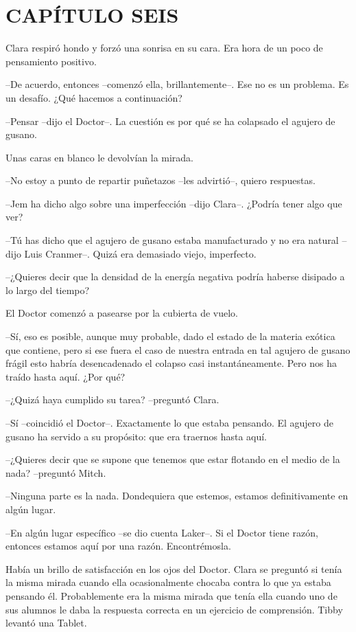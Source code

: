 \chapter*{CAPÍTULO SEIS}

{Clara respiró hondo y forzó una sonrisa en su cara. Era hora de un poco
de pensamiento positivo.}

{--De acuerdo, entonces --comenzó ella, brillantemente--. Ese no es un
problema. Es un desafío. ¿Qué hacemos a continuación?}

{--Pensar --dijo el Doctor--. La cuestión es por qué se ha colapsado el
agujero de gusano.}

{Unas caras en blanco le devolvían la mirada.}

{--No estoy a punto de repartir puñetazos --les advirtió--, quiero
respuestas.}

{--Jem ha dicho algo sobre una imperfección --dijo Clara--. ¿Podría tener
algo que ver?}

{--Tú has dicho que el agujero de gusano estaba manufacturado y no era
natural --dijo Luis Cranmer--. Quizá era demasiado viejo, imperfecto.}

{--¿Quieres decir que la densidad de la energía negativa podría haberse
disipado a lo largo del tiempo?}

{El Doctor comenzó a pasearse por la cubierta de vuelo.}

{--Sí, eso es posible, aunque muy probable, dado el estado de la materia
 exótica que contiene, pero si ese fuera el caso de nuestra entrada en
 tal agujero de gusano frágil esto habría desencadenado el colapso casi
instantáneamente. Pero nos ha traído hasta aquí. ¿Por qué?}

{--¿Quizá haya cumplido su tarea? --preguntó Clara.}

{--Sí --coincidió el Doctor--. Exactamente lo que estaba pensando. El
 agujero de gusano ha servido a su propósito: que era traernos hasta
aquí.}

{--¿Quieres decir que se supone que tenemos que estar flotando en el
medio de la nada? --preguntó Mitch.}

{--Ninguna parte es la nada. Dondequiera que estemos, estamos
definitivamente en algún lugar.}

{--En algún lugar específico --se dio cuenta Laker--. Si el Doctor tiene
razón, entonces estamos aquí por una razón. Encontrémosla.}

{Había un brillo de satisfacción en los ojos del Doctor. Clara se
 preguntó si tenía la misma mirada cuando ella ocasionalmente chocaba
 contra lo que ya estaba pensando él. Probablemente era la misma mirada
 que tenía ella cuando uno de sus alumnos le daba la respuesta correcta
en un ejercicio de comprensión. Tibby levantó una Tablet.}

